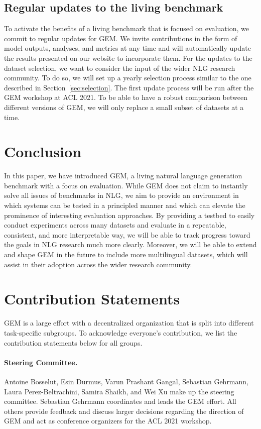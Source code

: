 \documentclass[11pt,a4paper]{article}
\newcommand{\GEM}{\textsc{GEM}}
\begin{document}
\subsection{Regular updates to the living benchmark}

To activate the benefits of a living benchmark that is focused on evaluation, we commit to regular updates for \GEM. We invite contributions in the form of model outputs, analyses, and metrics at any time and will automatically update the results presented on our website to incorporate them. 
For the updates to the dataset selection, we want to consider the input of the wider NLG research community. To do so, we will set up a yearly selection process similar to the one described in Section~\ref{sec:selection}. The first update process will be run after the GEM workshop at ACL 2021. 
To be able to have a robust comparison between different versions of \GEM, we will only replace a small subset of datasets at a time. 

\section{Conclusion}

In this paper, we have introduced \GEM, a living natural language generation benchmark with a focus on evaluation. While \GEM{} does not claim to instantly solve all issues of benchmarks in NLG, we aim to provide an environment in which systems can be tested in a principled manner and which can elevate the prominence of interesting evaluation approaches. By providing a testbed to easily conduct experiments across many datasets and evaluate in a repeatable, consistent, and more interpretable way, we will be able to track progress toward the goals in NLG research much more clearly. Moreover, we will be able to extend and shape \GEM{} in the future to include more multilingual datasets, which will assist in their adoption across the wider research community. 

\section{Contribution Statements}

\GEM{} is a large effort with a decentralized organization that is split into different task-specific subgroups. To acknowledge everyone's contribution, we list the contribution statements below for all groups.

\paragraph{Steering Committee.} Antoine Bosselut, Esin Durmus, Varun Prashant Gangal, Sebastian Gehrmann, Laura Perez-Beltrachini, Samira Shaikh, and Wei Xu make up the steering committee. Sebastian Gehrmann coordinates and leads the GEM effort. All others provide feedback and discuss larger decisions regarding the direction of GEM and act as conference organizers for the ACL 2021 workshop. 
\end{document}
